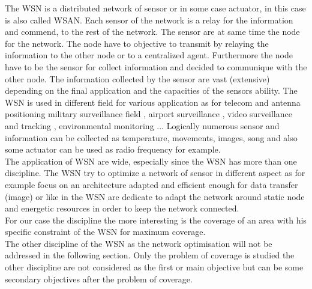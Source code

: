  The WSN is a distributed network of sensor or in some case actuator, in this case is also called WSAN. Each sensor of the network is a relay for the information and commend, to the rest of the network.  
The sensor are at same time the node for the network. The node have to objective to transmit by relaying the information to the other node or to a centralized agent.  Furthermore the node have to be the sensor for collect information and decided to communique with the other node. 
The information collected by the sensor are vast (extensive) depending on the final application and the capacities of the sensors ability. 
The WSN is used in different field for various application as for telecom and antenna positioning \cite{59*wang2008} military surveillance field \cite{38*liu2010,101*topcuoglu2009}, airport surveillance \cite{37*ma2012}, video surveillance and tracking \cite{38*liu2010}, environmental monitoring \cite{42*bulusu2001}... Logically numerous sensor and information can be collected  as temperature, movements, images, song and also some  actuator can be used as radio frequency for example.\\
 The application of WSN are wide, especially since the WSN has more than one discipline. The WSN try to optimize a network of sensor in different aspect as for example \cite{39*wu2011} focus on an architecture adapted and efficient enough for data transfer (image) or like in \cite{40*sohrabi2000} the WSN are dedicate to adapt the network around static node and energetic resources in order to keep the network connected.  \\
For our case the discipline the more interesting is the coverage of an area with his specific constraint of the WSN for maximum coverage.\\
 The other discipline of the WSN as the network optimisation will not be addressed in the following section. Only the problem of coverage is studied  the other discipline are not considered as the first or main objective but can be some secondary objectives after the problem of coverage.

